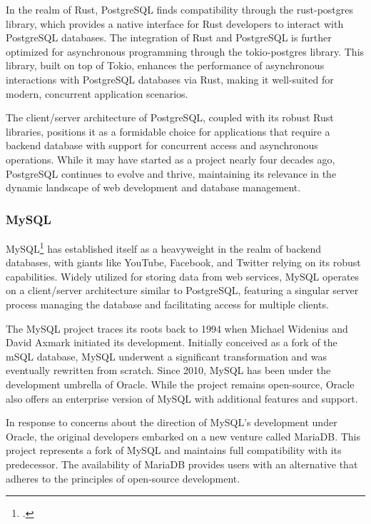 In the realm of Rust, PostgreSQL finds compatibility through the rust-postgres library, which provides a native interface for Rust developers to interact with 
PostgreSQL databases. The integration of Rust and PostgreSQL is further optimized for asynchronous programming through the tokio-postgres library. This library, 
built on top of Tokio, enhances the performance of asynchronous interactions with PostgreSQL databases via Rust, making it well-suited for modern, concurrent 
application scenarios.\newline

The client/server architecture of PostgreSQL, coupled with its robust Rust libraries, positions it as a formidable choice for applications that require a 
backend database with support for concurrent access and asynchronous operations. While it may have started as a project nearly four decades ago, PostgreSQL 
continues to evolve and thrive, maintaining its relevance in the dynamic landscape of web development and database management.

\subsubsection{MySQL}
MySQL\footcite{mysql} has established itself as a heavyweight in the realm of backend databases, with giants like YouTube, Facebook, and Twitter relying on its 
robust capabilities. Widely utilized for storing data from web services, MySQL operates on a client/server architecture similar to PostgreSQL, featuring a 
singular server process managing the database and facilitating access for multiple clients.\newline

The MySQL project traces its roots back to 1994 when Michael Widenius and David Axmark initiated its development. Initially conceived as a fork of the mSQL 
database, MySQL underwent a significant transformation and was eventually rewritten from scratch. Since 2010, MySQL has been under the development umbrella of 
Oracle. While the project remains open-source, Oracle also offers an enterprise version of MySQL with additional features and support.\newline

In response to concerns about the direction of MySQL's development under Oracle, the original developers embarked on a new venture called MariaDB. This project 
represents a fork of MySQL and maintains full compatibility with its predecessor. The availability of MariaDB provides users with an alternative that adheres 
to the principles of open-source development.\newline

